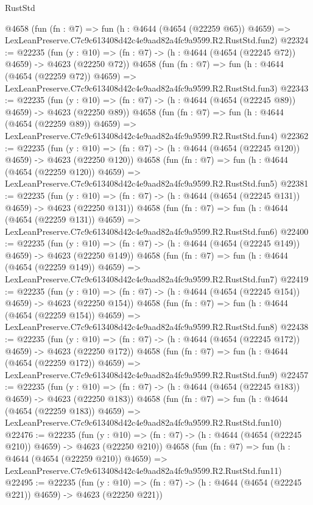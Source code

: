 \begin{lexlean}{RustStd}
\begin{coremodule}
    @4658
    (fun (fn : @7) =>
    fun (h : @4644 (@4654 (@22259 @65)) @4659) =>
    LexLeanPreserve.C7c9c613408d42c4e9aad82a4fc9a9599.R2.RustStd.fun2)
@22324 := @22235
    (fun (y : @10) => (fn : @7) -> (h : @4644 (@4654 (@22245 @72)) @4659) -> @4623 (@22250 @72))
    @4658
    (fun (fn : @7) =>
    fun (h : @4644 (@4654 (@22259 @72)) @4659) =>
    LexLeanPreserve.C7c9c613408d42c4e9aad82a4fc9a9599.R2.RustStd.fun3)
@22343 := @22235
    (fun (y : @10) => (fn : @7) -> (h : @4644 (@4654 (@22245 @89)) @4659) -> @4623 (@22250 @89))
    @4658
    (fun (fn : @7) =>
    fun (h : @4644 (@4654 (@22259 @89)) @4659) =>
    LexLeanPreserve.C7c9c613408d42c4e9aad82a4fc9a9599.R2.RustStd.fun4)
@22362 := @22235
    (fun (y : @10) => (fn : @7) -> (h : @4644 (@4654 (@22245 @120)) @4659) -> @4623 (@22250 @120))
    @4658
    (fun (fn : @7) =>
    fun (h : @4644 (@4654 (@22259 @120)) @4659) =>
    LexLeanPreserve.C7c9c613408d42c4e9aad82a4fc9a9599.R2.RustStd.fun5)
@22381 := @22235
    (fun (y : @10) => (fn : @7) -> (h : @4644 (@4654 (@22245 @131)) @4659) -> @4623 (@22250 @131))
    @4658
    (fun (fn : @7) =>
    fun (h : @4644 (@4654 (@22259 @131)) @4659) =>
    LexLeanPreserve.C7c9c613408d42c4e9aad82a4fc9a9599.R2.RustStd.fun6)
@22400 := @22235
    (fun (y : @10) => (fn : @7) -> (h : @4644 (@4654 (@22245 @149)) @4659) -> @4623 (@22250 @149))
    @4658
    (fun (fn : @7) =>
    fun (h : @4644 (@4654 (@22259 @149)) @4659) =>
    LexLeanPreserve.C7c9c613408d42c4e9aad82a4fc9a9599.R2.RustStd.fun7)
@22419 := @22235
    (fun (y : @10) => (fn : @7) -> (h : @4644 (@4654 (@22245 @154)) @4659) -> @4623 (@22250 @154))
    @4658
    (fun (fn : @7) =>
    fun (h : @4644 (@4654 (@22259 @154)) @4659) =>
    LexLeanPreserve.C7c9c613408d42c4e9aad82a4fc9a9599.R2.RustStd.fun8)
@22438 := @22235
    (fun (y : @10) => (fn : @7) -> (h : @4644 (@4654 (@22245 @172)) @4659) -> @4623 (@22250 @172))
    @4658
    (fun (fn : @7) =>
    fun (h : @4644 (@4654 (@22259 @172)) @4659) =>
    LexLeanPreserve.C7c9c613408d42c4e9aad82a4fc9a9599.R2.RustStd.fun9)
@22457 := @22235
    (fun (y : @10) => (fn : @7) -> (h : @4644 (@4654 (@22245 @183)) @4659) -> @4623 (@22250 @183))
    @4658
    (fun (fn : @7) =>
    fun (h : @4644 (@4654 (@22259 @183)) @4659) =>
    LexLeanPreserve.C7c9c613408d42c4e9aad82a4fc9a9599.R2.RustStd.fun10)
@22476 := @22235
    (fun (y : @10) => (fn : @7) -> (h : @4644 (@4654 (@22245 @210)) @4659) -> @4623 (@22250 @210))
    @4658
    (fun (fn : @7) =>
    fun (h : @4644 (@4654 (@22259 @210)) @4659) =>
    LexLeanPreserve.C7c9c613408d42c4e9aad82a4fc9a9599.R2.RustStd.fun11)
@22495 := @22235
    (fun (y : @10) => (fn : @7) -> (h : @4644 (@4654 (@22245 @221)) @4659) -> @4623 (@22250 @221))

\end{coremodule}
\end{lexlean}
